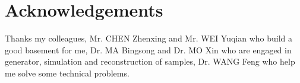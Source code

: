 \documentclass[11pt,a4paper]{cepcnote}
\newcommand{\BibTeX}{{\sc Bib\TeX}}
\begin{document}
%

\section{Acknowledgements}

Thanks my colleagues, Mr. CHEN Zhenxing and Mr. WEI Yuqian who build a good basement for me, 
Dr. MA Bingsong and Dr. MO Xin who are engaged in generator, simulation and reconstruction of samples, 
Dr. WANG Feng who help me solve some technical problems.

%
%
%
%
%
%





\end{document}
